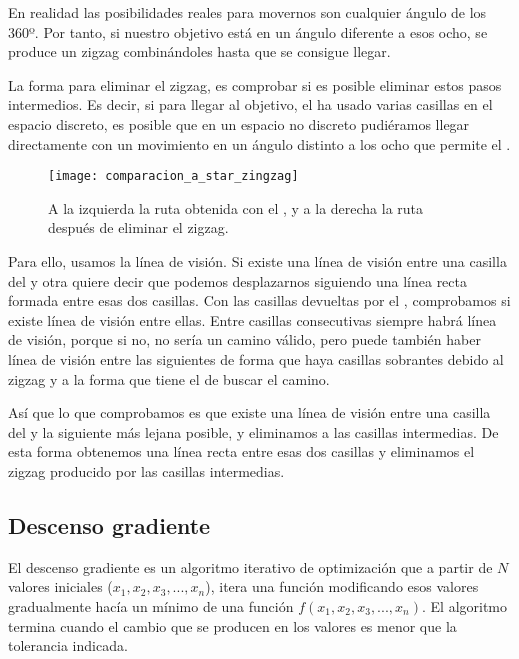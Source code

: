 En realidad las posibilidades reales para movernos son cualquier ángulo de los 360º. Por tanto, si nuestro objetivo está en un ángulo diferente a esos ocho, se produce un zigzag combinándoles hasta que se consigue llegar.

La forma para eliminar el zigzag, es comprobar si es posible eliminar estos pasos intermedios. Es decir, si para llegar al objetivo, el \Astar ha usado varias casillas en el espacio discreto, es posible que en un espacio no discreto pudiéramos llegar directamente con un movimiento en un ángulo distinto a los ocho que permite el \Astar.

\begin{figure}[!htpb]
    \centering
    \texttt{[image: comparacion\_a\_star\_zingzag]}
    \caption[Comparación entre la ruta del \Astar con y sin zigzag]{A la izquierda la ruta obtenida con el \Astar, y a la derecha la ruta después de eliminar el zigzag.}
    \label{fig:basics AFM sketch}
\end{figure}

Para ello, usamos la línea de visión. Si existe una línea de visión entre una casilla del \Astar y otra quiere decir que podemos desplazarnos siguiendo una línea recta formada entre esas dos casillas. Con las casillas devueltas por el \Astar, comprobamos si existe línea de visión entre ellas. Entre casillas consecutivas siempre habrá línea de visión, porque si no, no sería un camino válido, pero puede también haber línea de visión entre las siguientes de forma que haya casillas sobrantes debido al zigzag y a la forma que tiene el \Astar de buscar el camino.

Así que lo que comprobamos es que existe una línea de visión entre una casilla del \Astar y la siguiente más lejana posible, y eliminamos a las casillas intermedias. De esta forma obtenemos una línea recta entre esas dos casillas y eliminamos el zigzag producido por las casillas intermedias.

\subsection{Descenso gradiente}

El descenso gradiente es un algoritmo iterativo de optimización que a partir de $N$ valores iniciales ($x_1, x_2, x_3, ..., x_n$), itera una función modificando esos valores gradualmente hacía un mínimo de una función $f(x_1, x_2, x_3, ..., x_n)$. El algoritmo termina cuando el cambio que se producen en los valores es menor que la tolerancia indicada.

